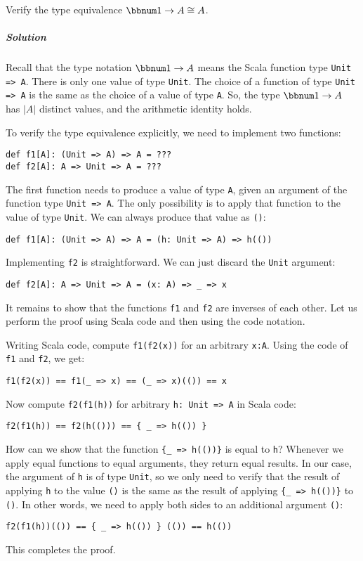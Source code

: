 Verify the type equivalence $\bbnum 1\rightarrow A\cong A$.

\subparagraph{Solution}

Recall that the type notation $\bbnum 1\rightarrow A$ means the Scala
function type \lstinline!Unit => A!. There is only one value of type
\lstinline!Unit!. The choice of a function of type \lstinline!Unit => A!
is the same as the choice of a value of type \lstinline!A!. So, the
type $\bbnum 1\rightarrow A$ has $\left|A\right|$ distinct values,
and the arithmetic identity holds.

To verify the type equivalence explicitly, we need to implement two
functions:
\begin{lstlisting}
def f1[A]: (Unit => A) => A = ???
def f2[A]: A => Unit => A = ???
\end{lstlisting}
The first function needs to produce a value of type \lstinline!A!,
given an argument of the function type \lstinline!Unit => A!. The
only possibility is to apply that function to the value of type \lstinline!Unit!.
We can always produce that value as \lstinline!()!:
\begin{lstlisting}
def f1[A]: (Unit => A) => A = (h: Unit => A) => h(())
\end{lstlisting}
Implementing \lstinline!f2! is straightforward. We can just discard
the \lstinline!Unit! argument:
\begin{lstlisting}
def f2[A]: A => Unit => A = (x: A) => _ => x
\end{lstlisting}
It remains to show that the functions \lstinline!f1! and \lstinline!f2!
are inverses of each other. Let us perform the proof using Scala code
and then using the code notation.

Writing Scala code, compute \lstinline!f1(f2(x))! for an arbitrary
\lstinline!x:A!. Using the code of \lstinline!f1! and \lstinline!f2!,
we get:
\begin{lstlisting}
f1(f2(x)) == f1(_ => x) == (_ => x)(()) == x
\end{lstlisting}
Now compute \lstinline!f2(f1(h))! for arbitrary \lstinline!h: Unit => A!
in Scala code:
\begin{lstlisting}
f2(f1(h)) == f2(h(())) == { _ => h(()) }
\end{lstlisting}
How can we show that the function \lstinline!{_ => h(())}! is equal
to \lstinline!h!? Whenever we apply equal functions to equal arguments,
they return equal results. In our case, the argument of \lstinline!h!
is of type \lstinline!Unit!, so we only need to verify that the result
of applying \lstinline!h! to the value \lstinline!()! is the same
as the result of applying \lstinline!{_ => h(())}! to \lstinline!()!.
In other words, we need to apply both sides to an additional argument
\lstinline!()!:
\begin{lstlisting}
f2(f1(h))(()) == { _ => h(()) } (()) == h(())
\end{lstlisting}
This completes the proof.

